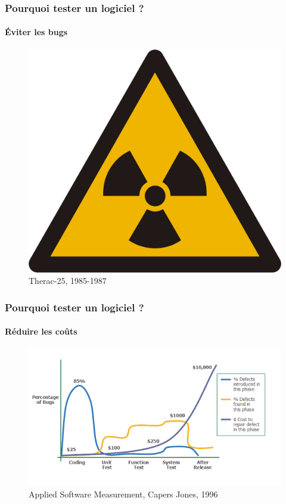 \documentclass{beamer}
\begin{document}
\begin{frame}
	\frametitle{Pourquoi tester un logiciel ?}
	\framesubtitle{\'{E}viter les bugs}
		\begin{figure}
			\centering
			\caption{Therac-25, 1985-1987}
			\includegraphics[scale=0.07]{img/therac}
		\end{figure}
\end{frame}

\begin{frame}
	\frametitle{Pourquoi tester un logiciel ?}
	\framesubtitle{R\'{e}duire les co\^{u}ts}
		\begin{figure}
			\centering
			\caption{Applied Software Measurement, Capers Jones, 1996}
			\includegraphics[scale=0.50]{img/defect}
		\end{figure}
\end{frame}
\end{document}
